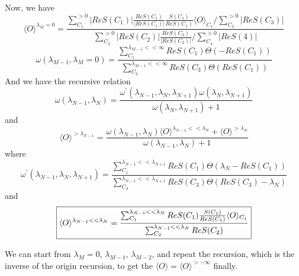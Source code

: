 \documentclass{article}
\begin{document}
    Now, we have
    \begin{equation}
    \boxed{
        \langle O \rangle^{\lambda_{M}=0} = \frac{\sum^{>0}_{C_{1}} \vert ReS(C_{1}) \vert \frac{ReS(C_{1})}{\vert ReS(C_{1}) \vert}  \frac{S(C_{1})}{ReS(C_{1})} \langle O \rangle_{C_{1}} / \sum^{>0}_{C_{3}} \vert ReS(C_{3}) \vert}
        {\sum^{>0}_{C_{2}} \vert ReS(C_{2}) \vert \frac{ReS(C_{2})}{\vert ReS(C_{2}) \vert} / \sum^{>0}_{C_{4}} \vert ReS(4) \vert}
        }
    \end{equation}
    \begin{equation}
        \boxed{
        \omega(\lambda_{M-1}, \lambda_{M}=0) = \frac{\sum^{\lambda_{M-1}<<\infty}_{C_{1}} ReS(C_{1}) \Theta(-ReS(C_{1}))  }
        {\sum^{\lambda_{M-1}<<\infty}_{C_{3}} ReS(C_{3}) \Theta(ReS(C_{1}))  }
        }
    \end{equation}
    And we have the recursive relation
    \begin{equation}
        \boxed{
        \omega(\lambda_{N-1},\lambda_{N}) = \frac{\omega^{\prime}(\lambda_{N-1}, \lambda_{N}, \lambda_{N+1}) \omega(\lambda_{N}, \lambda_{N+1})}{ \omega(\lambda_{N}, \lambda_{N+1}) + 1}
        }
    \end{equation}
    and
    \begin{equation}
        \boxed{
        \langle O \rangle^{>\lambda_{N-1}} = \frac{\omega(\lambda_{N-1},\lambda_{N}) \langle O \rangle^{\lambda_{N-1}<<\lambda_{N}} + \langle O \rangle^{>\lambda_{N}}}{\omega(\lambda_{N-1}, \lambda_{N})+1}
        }
    \end{equation}
    where
    \begin{equation}
        \boxed{
        \omega^{\prime}(\lambda_{N-1}, \lambda_{N}, \lambda_{N+1}) = \frac{ \sum^{\lambda_{N-1}<<\lambda_{N+1}}_{C_{1}} ReS(C_{1})  \Theta(\lambda_{N} - ReS(C_{1}))}
        { \sum^{\lambda_{N-1}<<\lambda_{N+1}}_{C_{3}} ReS(C_{3})  \Theta(ReS(C_{3})-\lambda_{N}) } 
        }
    \end{equation}
    and 
    \begin{equation}
        \boxed{
            \langle O \rangle^{\lambda_{N-1}<<\lambda_{N}} = \frac{\sum^{\lambda_{N-1}<<\lambda_{N}}_{C_{1}} ReS(C_{1})  \frac{S(C_{1})}{ReS(C_{1})} \langle O \rangle_{C_{1}}  }
            {\sum^{\lambda_{N-1}<<\lambda_{N}}_{C_{2}} ReS(C_{2}) }\\
        }
    \end{equation}

    We can start from $\lambda_{M}=0$, $\lambda_{M-1}$, $\lambda_{M-2}$, and repeat the recursion, which is the inverse of the origin recursion,
    to get the $\langle O \rangle = \langle O \rangle^{>-\infty}$ finally.
\end{document}
